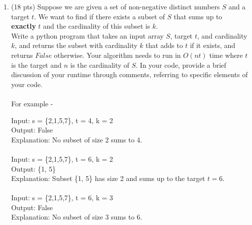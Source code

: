 \documentclass[12pt]{article}
\theoremstyle{remark}
\newtheorem*{solution}{Solution}
\begin{document}
\begin{enumerate}
\begin{enumerate}
\begin{solution}
        \end{solution}
        \pagebreak

	\end{enumerate}

\item (18 pts) Suppose we are given a set of non-negative distinct numbers $S$ and a target $t$. We want to find if there exists a subset of $S$ that sums up to \textbf{exactly} $t$ and the cardinality of this subset is $k$. 
\\Write a python program that takes an input array $S$, target $t$, and cardinality $k$, and returns the subset with cardinality $k$ that adds to $t$ if it exists, and returns $False$ otherwise. Your algorithm needs to run in $O(nt)$ time where $t$ is the target and $n$ is the cardinality of $S$. In your code, provide a brief discussion of your runtime through comments, referring to specific elements of your code.\\
\\For example - 

Input: s = \{2,1,5,7\}, t = 4, k = 2\\
Output: False\\
Explanation:  No subset of size $2$ sums to 4.\\\\
Input: s = \{2,1,5,7\}, t = 6, k = 2\\
Output: \{1, 5\}\\
Explanation:  Subset \{1, 5\} has size 2 and sums up to the target $t = 6$.\\\\
Input: s = \{2,1,5,7\}, t = 6, k = 3\\
Output: False\\
Explanation:  No subset of size $3$ sums to 6.\\\\

\noindent
\end{enumerate}
\end{document}
